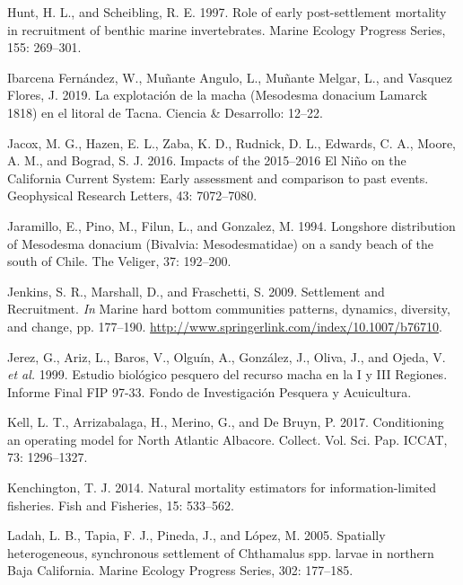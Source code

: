 \documentclass[12pt]{article}
\begin{document}
\leavevmode\hypertarget{ref-Hunt1997}{}%
Hunt, H. L., and Scheibling, R. E. 1997. Role of early post-settlement
mortality in recruitment of benthic marine invertebrates. Marine Ecology
Progress Series, 155: 269--301.

\leavevmode\hypertarget{ref-IbarcenaFernandez2019}{}%
Ibarcena Fernández, W., Muñante Angulo, L., Muñante Melgar, L., and
Vasquez Flores, J. 2019. La explotación de la macha (Mesodesma donacium
Lamarck 1818) en el litoral de Tacna. Ciencia \& Desarrollo: 12--22.

\leavevmode\hypertarget{ref-Jacox2016}{}%
Jacox, M. G., Hazen, E. L., Zaba, K. D., Rudnick, D. L., Edwards, C. A.,
Moore, A. M., and Bograd, S. J. 2016. Impacts of the 2015--2016 El Niño
on the California Current System: Early assessment and comparison to
past events. Geophysical Research Letters, 43: 7072--7080.

\leavevmode\hypertarget{ref-Jaramillo1994}{}%
Jaramillo, E., Pino, M., Filun, L., and Gonzalez, M. 1994. Longshore
distribution of Mesodesma donacium (Bivalvia: Mesodesmatidae) on a sandy
beach of the south of Chile. The Veliger, 37: 192--200.

\leavevmode\hypertarget{ref-Jenkins2009}{}%
Jenkins, S. R., Marshall, D., and Fraschetti, S. 2009. Settlement and
Recruitment. \emph{In} Marine hard bottom communities patterns,
dynamics, diversity, and change, pp. 177--190.
\url{http://www.springerlink.com/index/10.1007/b76710}.

\leavevmode\hypertarget{ref-Jerez1999}{}%
Jerez, G., Ariz, L., Baros, V., Olguín, A., González, J., Oliva, J., and
Ojeda, V. \emph{et al.} 1999. Estudio biológico pesquero del recurso
macha en la I y III Regiones. Informe Final FIP 97-33. Fondo de
Investigación Pesquera y Acuicultura.

\leavevmode\hypertarget{ref-Kell2017}{}%
Kell, L. T., Arrizabalaga, H., Merino, G., and De Bruyn, P. 2017.
Conditioning an operating model for North Atlantic Albacore. Collect.
Vol. Sci. Pap. ICCAT, 73: 1296--1327.

\leavevmode\hypertarget{ref-Kenchington2014}{}%
Kenchington, T. J. 2014. Natural mortality estimators for
information-limited fisheries. Fish and Fisheries, 15: 533--562.

\leavevmode\hypertarget{ref-Ladah2005}{}%
Ladah, L. B., Tapia, F. J., Pineda, J., and López, M. 2005. Spatially
heterogeneous, synchronous settlement of Chthamalus spp. larvae in
northern Baja California. Marine Ecology Progress Series, 302: 177--185.
\end{document}
